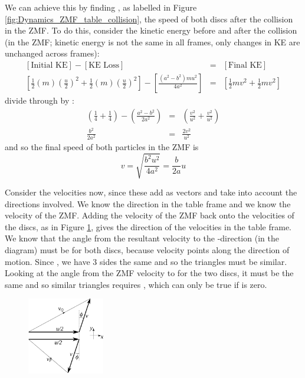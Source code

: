 \begin{problem}
{\begin{enumerate}
We can achieve this by finding , as labelled in Figure \ref{fig:Dynamics_ZMF_table_collision}, the speed of both discs after the collision in the ZMF. To do this, consider the kinetic energy before and after the collision (in the ZMF; kinetic energy is not the same in all frames, only changes in KE are unchanged across frames):
\begin{eqnarray*} 
\left[ \text{Initial KE} \right] - \left[ \text{KE Loss}\right] &=& \left[ \text{Final KE} \right] \\
\left[ \frac{1}{2}(m)\left(\frac{u}{2}\right)^{2} + \frac{1}{2}(m)\left(\frac{u}{2}\right)^{2} \right] - \left[\frac{(a^{2} - b^{2})mu^{2}}{4a^{2}}\right] &=& \left[ \frac{1}{2}mv^{2} + \frac{1}{2}mv^{2}\right]
\end{eqnarray*}
divide through by :
\begin{eqnarray*} 
\left( \frac{1}{4} + \frac{1}{4} \right) - \left( \frac{a^{2} - b^{2}}{2a^{2}} \right) &=& \left( \frac{v^{2}}{u^{2}} + \frac{v^{2}}{u^{2}} \right) \\
\frac{b^2}{2a^{2}} &=& \frac{2v^{2}}{u^{2}} 
\end{eqnarray*}
and so the final speed of both particles in the ZMF is
\begin{equation*} 
v = \sqrt{\frac{b^{2}u^{2}}{4a^{2}}} = \frac{b}{2a} u 
\end{equation*}

Consider the velocities now, since these add as vectors and take into account the directions involved. We know the direction in the table frame and we know the velocity of the ZMF. Adding the velocity of the ZMF back onto the velocities of the discs, as in Figure \ref{fig:Dynamics_ZMF_velocity_add}, gives the direction of the velocities in the table frame. We know that the angle from the resultant velocity to the -direction (in the diagram) must be \vari{\theta} for both discs, because velocity points along the direction of motion. Since , we have 3 sides the same and so the triangles must be similar. Looking at the angle from the ZMF velocity to  for the two discs, it must be the same and so similar triangles requires , which can only be true if \vari{\phi} is zero.

\begin{figure}[h]
\centering
\includegraphics[width=0.3\textwidth]{../../../figures/Dynamics_ZMF_velocity_add.svg}
\caption{}\label{fig:Dynamics_ZMF_velocity_add}
\end{figure}


\end{enumerate}}
\end{problem}
